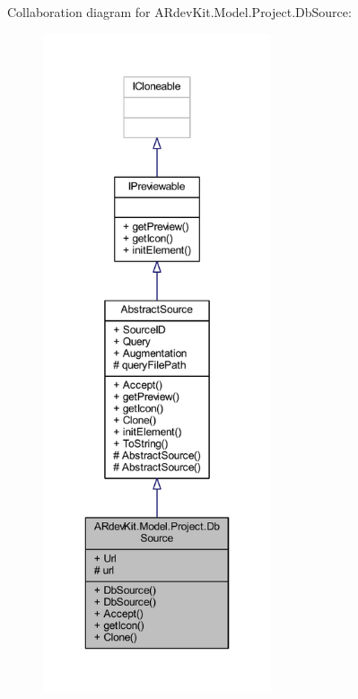 Collaboration diagram for A\-Rdev\-Kit.\-Model.\-Project.\-Db\-Source\-:
\nopagebreak
\begin{figure}[H]
\begin{center}
\leavevmode
\includegraphics[height=550pt]{class_a_rdev_kit_1_1_model_1_1_project_1_1_db_source__coll__graph}
\end{center}
\end{figure}
